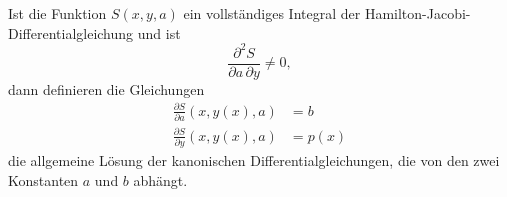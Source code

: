 \begin{satz}[Jacobi]
%
Ist die Funktion $S(x,y,a)$ ein vollständiges Integral der
Hamilton-Jacobi-Differentialgleichung und ist
\begin{equation}
\frac{\partial^2 S}{\partial a\,\partial y}\ne 0,
\label{buch:hamiltonjacobi:jacobi:satz:jacobi:eqn:regularitaet}
\end{equation}
dann definieren die Gleichungen
\begin{equation}
\begin{aligned}
\frac{\partial S}{\partial a}(x,y(x),a) &= b \\
\frac{\partial S}{\partial y}(x,y(x),a) &= p(x)
\end{aligned}
\label{buch:hamiltonjacobi:jacobi:satz:jacobi:eqn:equations}
\end{equation}
die allgemeine Lösung der kanonischen Differentialgleichungen, die von
den zwei Konstanten $a$ und $b$ abhängt.
\end{satz}

